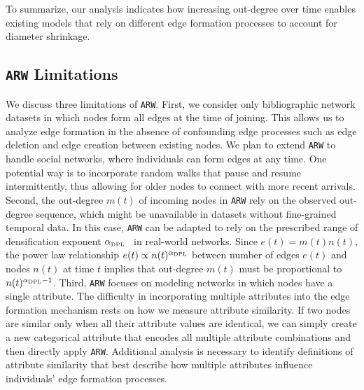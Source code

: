 To summarize, our analysis indicates how increasing out-degree over time enables
existing models that rely on different edge formation processes to account for
diameter shrinkage.


\subsection{\texttt{ARW} Limitations}
We discuss three limitations of \texttt{ARW}. First, we  consider only
bibliographic  network datasets in which nodes form all edges at the time of joining.
This allows us to analyze edge formation in the absence of confounding edge
processes such as edge deletion and edge creation between existing nodes. We
plan to extend \texttt{ARW} to handle social networks, where individuals can
form edges at any time. One potential way is to incorporate random walks that
pause and resume intermittently, thus allowing for older nodes to connect with
more recent arrivals.
Second, the out-degree $m(t)$ of incoming nodes in \texttt{ARW} rely on the
observed out-degree sequence, which might be unavailable in
datasets without fine-grained temporal data. In this case, \texttt{ARW}
can be adapted to rely on the prescribed range of densification exponent $\alpha_{\tiny \mbox{DPL}}$~\cite{leskovec2005graphs}
in real-world networks.
Since $e(t)=m(t)n(t)$, the power law relationship $e(t) \propto n(t)^{\alpha_{\tiny \mbox{DPL}}}$ between
number of edges $e(t)$ and nodes $n(t)$ at time $t$ implies that out-degree $m(t)$ must be proportional
to $n(t)^{\alpha_{\tiny \mbox{DPL}}-1}$.
Third, \texttt{ARW} focuses on modeling networks in which nodes have a single attribute.
The difficulty in incorporating multiple attributes into the edge formation mechanism rests
on how we measure attribute similarity. If two nodes are similar only when all their
attribute values are identical, we can simply create a new categorical attribute that encodes all
multiple attribute combinations and then directly apply \texttt{ARW}.
Additional analysis is necessary to identify definitions of attribute similarity that best
describe how multiple attributes influence individuals' edge formation processes.
